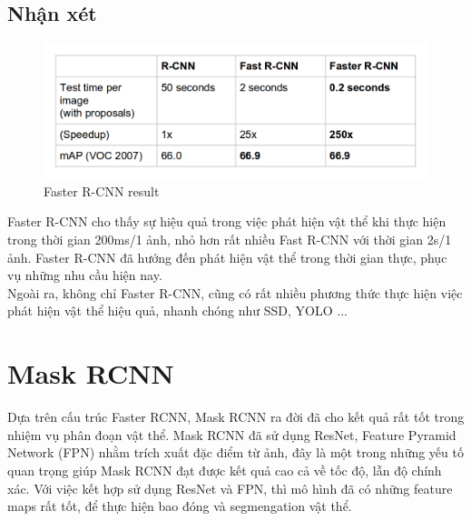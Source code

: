
\subsection{Nhận xét}

\begin{center}
   \begin{figure}[H]
   \begin{center}
     \includegraphics[scale=0.4]{image/fasterrcnn_result}
    \end{center}
    \caption{Faster R-CNN result}
    \label{ref_fasterrcnn_result}
    \end{figure}
\end{center}

Faster R-CNN cho thấy sự hiệu quả trong việc phát hiện vật thể khi thực hiện trong thời gian 200ms/1 ảnh, nhỏ hơn rất nhiều Fast R-CNN với thời gian 2s/1 ảnh. Faster R-CNN đã hướng đến phát hiện vật thể trong thời gian thực, phục vụ những nhu cầu hiện nay.\\

Ngoài ra, không chỉ Faster R-CNN, cũng có rất nhiều phương thức thực hiện việc phát hiện vật thể hiệu quả, nhanh chóng như SSD, YOLO ...\\


\section{Mask RCNN}

Dựa trên cấu trúc Faster RCNN, Mask RCNN \cite{He2017MaskR} ra đời đã cho kết quả rất tốt trong nhiệm vụ phân đoạn vật thể. Mask RCNN đã sử dụng ResNet, Feature Pyramid Network (FPN) nhằm trích xuất đặc điểm từ ảnh, đây là một trong những yếu tố quan trọng giúp Mask RCNN đạt được kết quả cao cả về tốc độ, lẫn độ chính xác. Với việc kết hợp sử dụng ResNet và FPN, thì mô hình đã có những feature maps rất tốt, để thực hiện bao đóng và segmengation vật thể. \\


